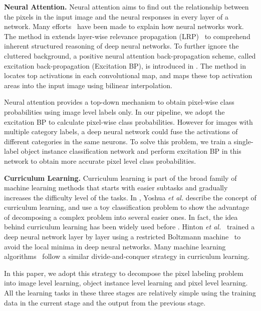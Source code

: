 \documentclass[10pt,twocolumn,letterpaper]{article}
\begin{document}
\noindent\textbf{Neural Attention.} Neural attention aims to find out the relationship between the pixels in the input image and the neural responses in every layer of a network. Many efforts~\cite{zhang2016top,bau2017network,lapuschkin2016analyzing} have been made to explain how neural networks work. The method in \cite{lapuschkin2016analyzing} extends layer-wise relevance propagation (LRP)~\cite{bach2015pixel} to comprehend inherent structured reasoning of deep neural networks. To further ignore the cluttered background, a positive neural attention back-propagation scheme, called excitation back-propagation (Excitation BP), is introduced in \cite{zhang2016top}. The method in \cite{bau2017network} locates top activations in each convolutional map, and maps these top activation areas into the input image using bilinear interpolation.

\vspace{-0mm}
Neural attention provides a top-down mechanism to obtain pixel-wise class probabilities using image level labels only. In our pipeline, we adopt the excitation BP \cite{zhang2016top} to calculate pixel-wise class probabilities. However for images with multiple category labels, a deep neural network could fuse the activations of different categories in the same neurons. To solve this problem, we train a single-label object instance classification network and perform excitation BP in this network to obtain more accurate pixel level class probabilities.

\noindent\textbf{Curriculum Learning.} Curriculum learning \cite{bengio2009curriculum} is part of the broad family of machine learning methods that starts with easier subtasks and gradually increases the difficulty level of the tasks. In \cite{bengio2009curriculum}, Yoshua {\em et al.} describe the concept of curriculum learning, and use a toy classification problem to show the advantage of decomposing a complex problem into several easier ones. In fact, the idea behind curriculum learning has been widely used before \cite{bengio2009curriculum}. Hinton {\em et al.}~\cite{hinton2006fast} trained a deep neural network layer by layer using a restricted Boltzmann machine~\cite{smolensky1986information} to avoid the local minima in deep neural networks. Many machine learning algorithms~\cite{sun2015robust,graves2017automated} follow a similar divide-and-conquer strategy in curriculum learning.

\vspace{-0mm}
In this paper, we adopt this strategy to decompose the pixel labeling problem into image level learning, object instance level learning and pixel level learning. All the learning tasks in these three stages are relatively simple using the training data in the current stage and the output from the previous stage.
\end{document}
